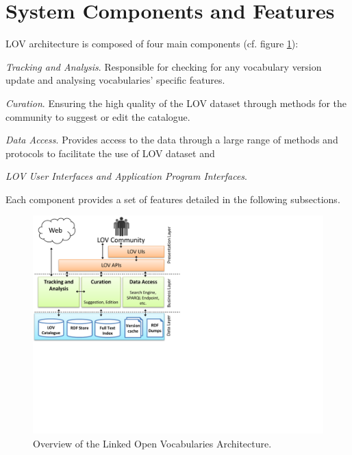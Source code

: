 \documentclass{iosart2c}
\begin{document}
\section{System Components and Features}\label{sec:arch}
	 LOV architecture is composed of four main components (cf. figure \ref{fig:arch}): 
\begin{inparaenum}[1)] 
	\item \emph{Tracking and Analysis}. Responsible for checking  for any vocabulary version update and analysing vocabularies' specific features.
	\item \emph{Curation}. Ensuring the high quality of the LOV dataset through methods for the community to suggest or edit the catalogue.
	\item \emph{Data Access}. Provides access to the data through a large range of methods and protocols to facilitate the use of LOV dataset and
	\item \emph{LOV User Interfaces and Application Program Interfaces}.
\end{inparaenum} 
Each component provides a set of features detailed in the following subsections.


\begin{figure}[ht!b]
\includegraphics[trim={0cm 8cm 0cm 0cm},scale=.6]{lov_architecture.pdf}
\caption{Overview of the Linked Open Vocabularies Architecture.}
\label{fig:arch}
\end{figure}
\end{document}
